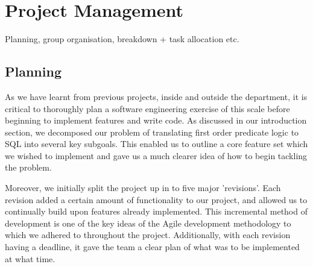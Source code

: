 \documentclass[a4wide, 11pt]{article}
\begin{document}
\section{Project Management}

        Planning, group organisation, breakdown + task allocation etc.

\subsection{Planning}


As we have learnt from previous projects, inside and outside the department, it
is critical to thoroughly plan a software engineering exercise of this scale
before beginning to implement features and write code. As discussed in our
introduction section, we decomposed our problem of translating first order
predicate logic to SQL into several key subgoals. This enabled us to outline a
core feature set which we wished to implement and gave us a much clearer idea
of how to begin tackling the problem.

Moreover, we initially split the project up in to five major 'revisions'. Each
revision added a certain amount of functionality to our project, and allowed us
to continually build upon features already implemented. This incremental method
of development is one of the key ideas of the Agile development methodology to
which we adhered to throughout the project.  Additionally,
with each revision having a deadline, it gave the team a clear plan of what was
to be implemented at what time.
\end{document}
